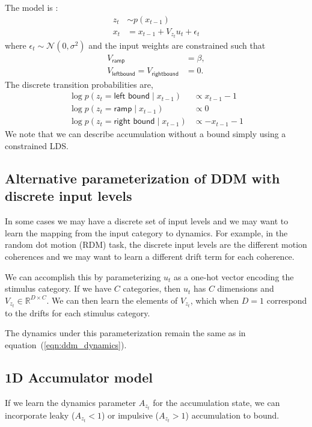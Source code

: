 \documentclass{article}
\begin{document}
The model is :
\begin{align}
z_t &\sim p(x_{t-1}) \\
x_t &= x_{t-1} + V_{z_t} u_t + \epsilon_t 
\label{eqn:ddm_dynamics}
\end{align}
where $\epsilon_t \sim \mathcal{N}(0, \sigma^2)$ and the input weights are constrained such that
\begin{align*}
V_{\mathsf{ramp}} &= \beta, \\
V_{\mathsf{left bound}} = V_{\mathsf{right bound}} &= 0.
\end{align*}
The discrete transition probabilities are,
\begin{align*}
\log p(z_t = \textsf{left bound} \mid x_{t-1}) &\propto x_{t-1} - 1 \\
\log p(z_t = \textsf{ramp} \mid x_{t-1}) &\propto 0 \\
\log p(z_t = \textsf{right bound} \mid x_{t-1}) &\propto -x_{t-1} - 1
\end{align*}
We note that we can describe accumulation without a bound simply using a constrained LDS. 

\subsection{Alternative parameterization of DDM with discrete input levels}
In some cases we may have a discrete set of input levels and we may want to learn the mapping from the input category to dynamics. For example, in the random dot motion (RDM) task, the discrete input levels are the different motion coherences and we may want to learn a different drift term for each coherence. 

We can accomplish this by parameterizing $u_t$ as a one-hot vector encoding the stimulus category. If we have $C$ categories, then $u_t$ has $C$ dimensions and $V_{z_t} \in \mathbb{R}^{D \times C}$. We can then learn the elements of $V_{z_t}$, which when $D = 1$ correspond to the drifts for each stimulus category. 

 The dynamics under this parameterization remain the same as in equation~(\ref{eqn:ddm_dynamics}). 


\subsection{1D Accumulator model}
If we learn the dynamics parameter $A_{z_t}$ for the accumulation state, we can incorporate leaky ($A_{z_t} < 1$) or impulsive ($A_{z_t} > 1$) accumulation to bound. 
\end{document}
